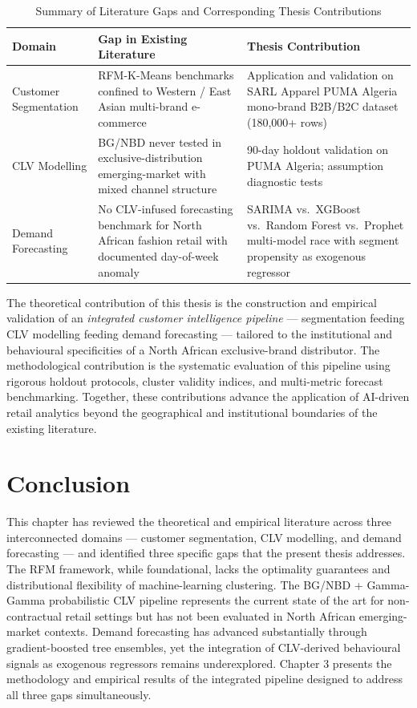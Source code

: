\begin{table}[H]
\centering
\caption{Summary of Literature Gaps and Corresponding Thesis Contributions}
\label{tab:lit_gap_summary}
\begin{tabular}{@{}p{3cm}p{5.5cm}p{5.5cm}@{}}
\toprule
\textbf{Domain} & \textbf{Gap in Existing Literature} & \textbf{Thesis Contribution} \\
\midrule
Customer Segmentation & RFM-K-Means benchmarks confined to Western / East Asian multi-brand e-commerce & Application and validation on SARL Apparel PUMA Algeria mono-brand B2B/B2C dataset (180,000+ rows) \\
\addlinespace
CLV Modelling & BG/NBD never tested in exclusive-distribution emerging-market with mixed channel structure & 90-day holdout validation on PUMA Algeria; assumption diagnostic tests \\
\addlinespace
Demand Forecasting & No CLV-infused forecasting benchmark for North African fashion retail with documented day-of-week anomaly & SARIMA vs.\ XGBoost vs.\ Random Forest vs.\ Prophet multi-model race with segment propensity as exogenous regressor \\
\bottomrule
\end{tabular}
\end{table}

The theoretical contribution of this thesis is the construction and empirical validation of an \textit{integrated customer intelligence pipeline} — segmentation feeding CLV modelling feeding demand forecasting — tailored to the institutional and behavioural specificities of a North African exclusive-brand distributor. The methodological contribution is the systematic evaluation of this pipeline using rigorous holdout protocols, cluster validity indices, and multi-metric forecast benchmarking. Together, these contributions advance the application of AI-driven retail analytics beyond the geographical and institutional boundaries of the existing literature.

\section*{Conclusion}

This chapter has reviewed the theoretical and empirical literature across three interconnected domains — customer segmentation, CLV modelling, and demand forecasting — and identified three specific gaps that the present thesis addresses. The RFM framework, while foundational, lacks the optimality guarantees and distributional flexibility of machine-learning clustering. The BG/NBD + Gamma-Gamma probabilistic CLV pipeline represents the current state of the art for non-contractual retail settings but has not been evaluated in North African emerging-market contexts. Demand forecasting has advanced substantially through gradient-boosted tree ensembles, yet the integration of CLV-derived behavioural signals as exogenous regressors remains underexplored. Chapter 3 presents the methodology and empirical results of the integrated pipeline designed to address all three gaps simultaneously.